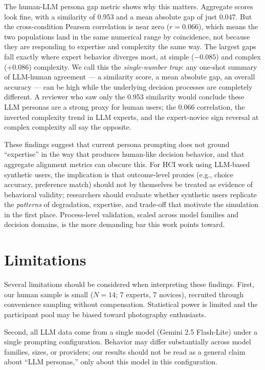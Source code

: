 \documentclass{sigchi-ext}
\begin{document}
The human-LLM persona gap metric shows why this matters. Aggregate scores look fine, with a similarity of 0.953 and a mean absolute gap of just 0.047. But the cross-condition Pearson correlation is near zero ($r = 0.066$), which means the two populations land in the same numerical range by coincidence, not because they are responding to expertise and complexity the same way. The largest gaps fall exactly where expert behavior diverges most, at simple ($-0.085$) and complex ($+0.086$) complexity. We call this the \emph{single-number trap}: any one-shot summary of LLM-human agreement --- a similarity score, a mean absolute gap, an overall accuracy --- can be high while the underlying decision processes are completely different. A reviewer who saw only the 0.953 similarity would conclude these LLM personas are a strong proxy for human users; the 0.066 correlation, the inverted complexity trend in LLM experts, and the expert-novice sign reversal at complex complexity all say the opposite.

These findings suggest that current persona prompting does not ground ``expertise'' in the way that produces human-like decision behavior, and that aggregate alignment metrics can obscure this. For HCI work using LLM-based synthetic users, the implication is that outcome-level proxies (e.g., choice accuracy, preference match) should not by themselves be treated as evidence of behavioral validity; researchers should evaluate whether synthetic users replicate the \emph{patterns} of degradation, expertise, and trade-off that motivate the simulation in the first place. Process-level validation, scaled across model families and decision domains, is the more demanding bar this work points toward.

\section{Limitations}
Several limitations should be considered when interpreting these findings.
First, our human sample is small ($N = 14$; 7 experts, 7 novices), recruited through convenience sampling without compensation. Statistical power is limited and the participant pool may be biased toward photography enthusiasts.

Second, all LLM data come from a single model (Gemini 2.5 Flash-Lite) under a single prompting configuration. Behavior may differ substantially across model families, sizes, or providers; our results should not be read as a general claim about ``LLM personas,'' only about this model in this configuration.
\end{document}

